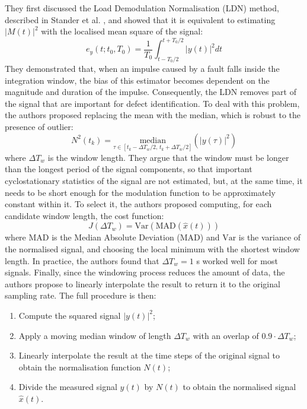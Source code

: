 They first discussed the Load Demodulation Normalisation (LDN) method, described in Stander et al. \cite{STANDER20021005}, and showed that it is equivalent to estimating $|M(t)|^2$ with the localised mean square of the signal:
\begin{equation}
    e_y(t;t_0, T_0) = \frac{1}{T_0}\int_{t - T_0/2}^{t + T_0/2} |y(t)|^2 dt
\end{equation}
They demonstrated that, when an impulse caused by a fault falls inside the integration window, the bias of this estimator becomes dependent on the magnitude and duration of the impulse. Consequently, the LDN removes part of the signal that are important for defect identification. To deal with this problem, the authors proposed replacing the mean with the median, which is robust to the presence of outlier:
\begin{equation}
    N^2(t_k) = \underset{\tau \in \left[t_k - \Delta T_w/2, \, t_k + \Delta T_w/2\right]}{\text{median}} \left(|y(\tau)|^2\right)
\end{equation}
where $\Delta T_w$ is the window length. They argue that the window must be longer than the longest period of the signal components, so that important cyclostationary statistics of the signal are not estimated, but, at the same time, it needs to be short enough for the modulation function to be approximately constant within it. To select it, the authors proposed computing, for each candidate window length, the cost function:
\begin{equation}
    J(\Delta T_w) = \text{Var}\left(\text{MAD}\left(\hat{x}(t)\right)\right)
\end{equation}
where $\text{MAD}$ is the Median Absolute Deviation (MAD) and $\text{Var}$ is the variance of the normalised signal, and choosing the local minimum with the shortest window length. In practice, the authors found that $\Delta T_w = 1$ s worked well for most signals. Finally, since the windowing process reduces the amount of data, the authors propose to linearly interpolate the result to return it to the original sampling rate. The full procedure is then:
\begin{enumerate}
    \item Compute the squared signal $|y(t)|^2$;
    \item Apply a moving median window of length $\Delta T_w$ with an overlap of $0.9 \cdot \Delta T_w$;
    \item Linearly interpolate the result at the time steps of the original signal to obtain the normalisation function $N(t)$;
    \item Divide the measured signal $y(t)$ by $N(t)$ to obtain the normalised signal $\hat{x}(t)$.
\end{enumerate}

